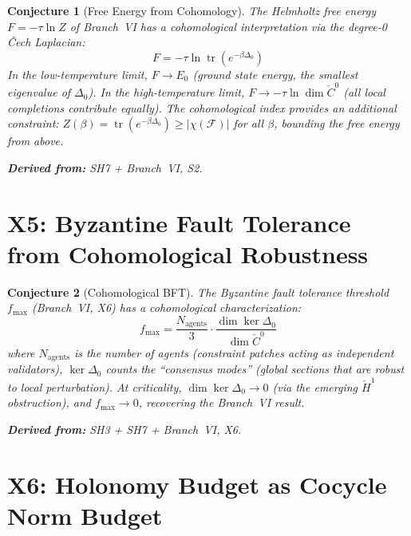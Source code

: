 \documentclass[11pt,letterpaper]{article}
\newtheorem{conjecture}{Conjecture}[section]
\newcommand{\tr}{\operatorname{tr}}
\newcommand{\Cech}{\check{C}}
\newcommand{\Hcech}{\check{H}}
\newcommand{\sheaf}{\mathcal{F}}
\begin{document}
\begin{conjecture}[Free Energy from Cohomology]\label{conj:x_free}
The Helmholtz free energy $F = -\tau \ln Z$ of Branch~VI has a 
cohomological interpretation via the degree-0 \v{C}ech Laplacian:
\begin{equation}\label{eq:coh_free_energy}
    F = -\tau \ln \tr\left(e^{-\beta \Delta_0}\right)
\end{equation}
In the low-temperature limit, $F \to E_0$ (ground state energy, 
the smallest eigenvalue of $\Delta_0$). In the high-temperature 
limit, $F \to -\tau \ln \dim \Cech^0$ (all local completions 
contribute equally). The cohomological index provides an additional 
constraint: $Z(\beta) = \tr(e^{-\beta \Delta_0}) \geq |\chi(\sheaf)|$ 
for all $\beta$, bounding the free energy from above.

\textbf{Derived from:} SH7 + Branch~VI, S2.
\end{conjecture}

\section{X5: Byzantine Fault Tolerance from Cohomological Robustness}

\begin{conjecture}[Cohomological BFT]\label{conj:x_bft}
The Byzantine fault tolerance threshold $f_{\max}$ (Branch~VI, X6) 
has a cohomological characterization:
\begin{equation}\label{eq:coh_bft}
    f_{\max} = \frac{N_{\mathrm{agents}}}{3} \cdot 
    \frac{\dim \ker \Delta_0}{\dim \Cech^0}
\end{equation}
where $N_{\mathrm{agents}}$ is the number of agents (constraint 
patches acting as independent validators), $\ker \Delta_0$ counts 
the ``consensus modes'' (global 
sections that are robust to local perturbation). At criticality, 
$\dim \ker \Delta_0 \to 0$ (via the emerging $\Hcech^1$ 
obstruction), and $f_{\max} \to 0$, recovering the Branch~VI result.

\textbf{Derived from:} SH3 + SH7 + Branch~VI, X6.
\end{conjecture}

\section{X6: Holonomy Budget as Cocycle Norm Budget}
\end{document}
